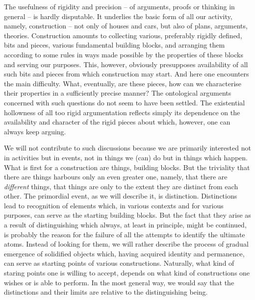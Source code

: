 \pan The usefulness of rigidity and precision -- of arguments, proofs or
thinking in general -- is hardly disputable. It underlies the basic form of all
our activity, namely, construction -- not only of houses and cars, but also of
plans, arguments, theories. Construction amounts to collecting various,
preferably rigidly defined, bits and pieces, various fundamental building
blocks, and arranging them according to some rules in ways made possible by the
properties of these blocks and serving our purposes. This, however, obviously
presupposes availability of all such bits and pieces from which construction may
start. And here one encounters the main difficulty. What, eventually, are these
pieces, how can we characterise their properties in a sufficiently precise
manner? The ontological arguments concerned with such questions do not seem to
have been settled.  The existential hollowness of all too rigid argumentation
reflects simply its dependence on the availability and character of the rigid
pieces about which, however, one can always keep arguing.

We will not contribute to such discussions because we are primarily interested
not in activities but in events, not in things we (can) do but in things which
happen. What is first for a construction are things, building blocks. But the
triviality that there are things harbours only an even greater one, namely, that
there are {\em different} things, that things are only to the extent they are
distinct from each other.  The primordial event, as we will describe it, is
distinction.  Distinctions lead to recognition of elements which, in various
contexts and for various purposes, can serve as the starting building blocks. But
the fact that they arise as a result of distinguishing which always, at least in
principle, might be continued, is probably the reason for the failure of all the
attempts to identify the ultimate atoms. Instead of looking for them, we will
rather describe the process of gradual emergence of solidified objects which,
having acquired identity and permanence, can serve as starting points of various
constructions. Naturally, what kind of staring points one is willing to accept,
depends on what kind of constructions one wishes or is able to perform. In the
most general way, we would say that the distinctions and their limits are
relative to the distinguishing being.

